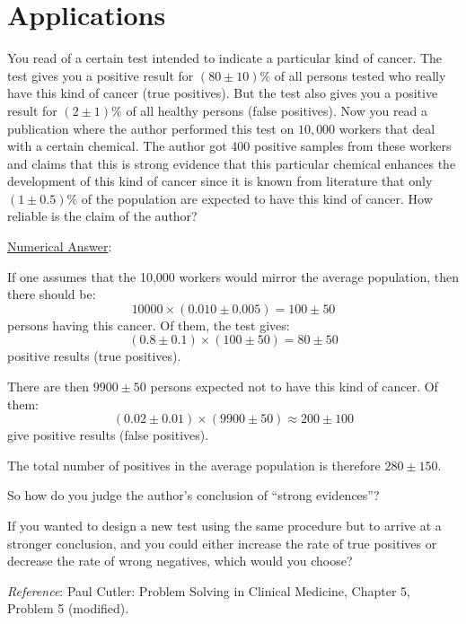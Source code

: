 \newpage
\section{Applications}
You read of a certain test intended to indicate a particular kind of cancer. The test gives you a positive result for $(80 \pm 10) \%$ of all persons tested who really have this kind of cancer (true positives). But the test also gives you a positive result for $(2 \pm 1) \%$ of all healthy persons (false positives). Now you read a publication where the author performed this test on $10,000$ workers that deal with a certain chemical. The author got 400 positive samples from these workers and claims that this is strong evidence that this particular chemical enhances the development of this kind of cancer since it is known from literature that only $(1 \pm 0.5)\%$ of the population are expected to have this kind of cancer. How reliable is the claim of the author?\myskip

\noindent \underline{Numerical Answer}:

If one assumes that the 10,000 workers would mirror the average population, then there should be:
\begin{equation}
    10000 \times (0.010 \pm 0.005) = 100 \pm 50
\end{equation}
persons having this cancer. Of them, the test gives:
\begin{equation}
    (0.8 \pm 0.1) \times (100 \pm 50) = 80 \pm 50
\end{equation}
positive results (true positives).\myskip

There are then $9900 \pm 50$ persons expected not to have this kind of cancer. Of them:
\begin{equation}
    (0.02 \pm 0.01) \times (9900 \pm 50) \approx 200 \pm 100
\end{equation}
give positive results (false positives).\myskip

The total number of positives in the average population is therefore $280 \pm 150$.\myskip

So how do you judge the author's conclusion of ``strong evidences''?\myskip

If you wanted to design a new test using the same procedure but to arrive at a stronger conclusion, and you could either increase the rate of true positives or decrease the rate of wrong negatives, which would you choose?\myskip

\noindent\emph{Reference}: Paul Cutler: Problem Solving in Clinical Medicine, Chapter 5, Problem 5 (modified).

